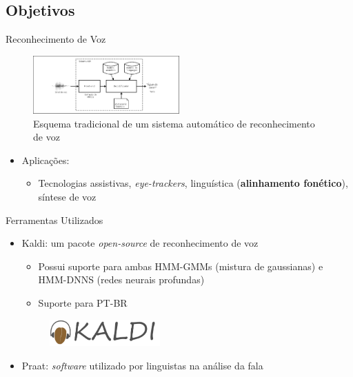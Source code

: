\subsection{Objetivos}
\begin{frame}{Reconhecimento de Voz}

\begin{figure}
	\includegraphics[width=0.5\textwidth]{Figures/asr}
    \caption{Esquema tradicional de um sistema autom\'atico de reconhecimento de voz}
\end{figure}

\begin{itemize}
    \item Aplica\c c\~oes:
    \begin{itemize}
        \smallskip
		\item Tecnologias assistivas, \textit{eye-trackers}, lingu\'istica (\textbf{alinhamento fon\'etico}), s\'intese de voz
    \end{itemize}
\end{itemize}
\end{frame}

\begin{frame}{Ferramentas Utilizados}
    \begin{itemize}
        \item Kaldi: um pacote \textit{open-source} de reconhecimento de voz
			\begin{itemize}
				\item Possui suporte para ambas HMM-GMMs (mistura de gaussianas) e HMM-DNNS (redes neurais profundas)
				\item Suporte para PT-BR
			\end{itemize}
		\begin{figure}
		\begin{center}
			\includegraphics[width=0.4\textwidth]{Figures/kaldi}
		\end{center}
		\end{figure}

        \item Praat: \textit{software} utilizado por linguistas na  an\'alise da fala

    \end{itemize}
\end{frame}


